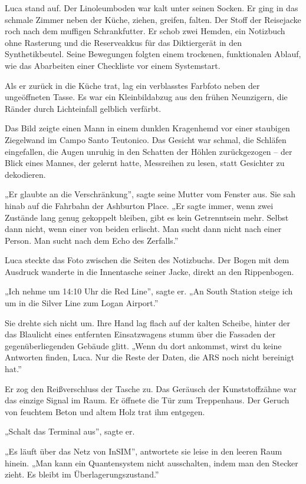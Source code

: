 \documentclass[
  ngerman,
]{article}
\begin{document}
Luca stand auf. Der Linoleumboden war kalt unter seinen Socken. Er ging
in das schmale Zimmer neben der Küche, ziehen, greifen, falten. Der
Stoff der Reisejacke roch nach dem muffigen Schrankfutter. Er schob zwei
Hemden, ein Notizbuch ohne Rasterung und die Reserveakkus für das
Diktiergerät in den Synthetikbeutel. Seine Bewegungen folgten einem
trockenen, funktionalen Ablauf, wie das Abarbeiten einer Checkliste vor
einem Systemstart.

Als er zurück in die Küche trat, lag ein verblasstes Farbfoto neben der
ungeöffneten Tasse. Es war ein Kleinbildabzug aus den frühen Neunzigern,
die Ränder durch Lichteinfall gelblich verfärbt.

Das Bild zeigte einen Mann in einem dunklen Kragenhemd vor einer
staubigen Ziegelwand im Campo Santo Teutonico. Das Gesicht war schmal,
die Schläfen eingefallen, die Augen unruhig in den Schatten der Höhlen
zurückgezogen -- der Blick eines Mannes, der gelernt hatte, Messreihen
zu lesen, statt Gesichter zu dekodieren.

„Er glaubte an die Verschränkung'', sagte seine Mutter vom Fenster aus.
Sie sah hinab auf die Fahrbahn der Ashburton Place. „Er sagte immer,
wenn zwei Zustände lang genug gekoppelt bleiben, gibt es kein
Getrenntsein mehr. Selbst dann nicht, wenn einer von beiden erlischt.
Man sucht dann nicht nach einer Person. Man sucht nach dem Echo des
Zerfalls.''

Luca steckte das Foto zwischen die Seiten des Notizbuchs. Der Bogen mit
dem Ausdruck wanderte in die Innentasche seiner Jacke, direkt an den
Rippenbogen.

„Ich nehme um 14:10 Uhr die Red Line'', sagte er. „An South Station
steige ich um in die Silver Line zum Logan Airport.''

Sie drehte sich nicht um. Ihre Hand lag flach auf der kalten Scheibe,
hinter der das Blaulicht eines entfernten Einsatzwagens stumm über die
Fassaden der gegenüberliegenden Gebäude glitt. „Wenn du dort ankommst,
wirst du keine Antworten finden, Luca. Nur die Reste der Daten, die ARS
noch nicht bereinigt hat.''

Er zog den Reißverschluss der Tasche zu. Das Geräusch der
Kunststoffzähne war das einzige Signal im Raum. Er öffnete die Tür zum
Treppenhaus. Der Geruch von feuchtem Beton und altem Holz trat ihm
entgegen.

„Schalt das Terminal aus'', sagte er.

„Es läuft über das Netz von InSIM'', antwortete sie leise in den leeren
Raum hinein. „Man kann ein Quantensystem nicht ausschalten, indem man
den Stecker zieht. Es bleibt im Überlagerungszustand.''
\end{document}
